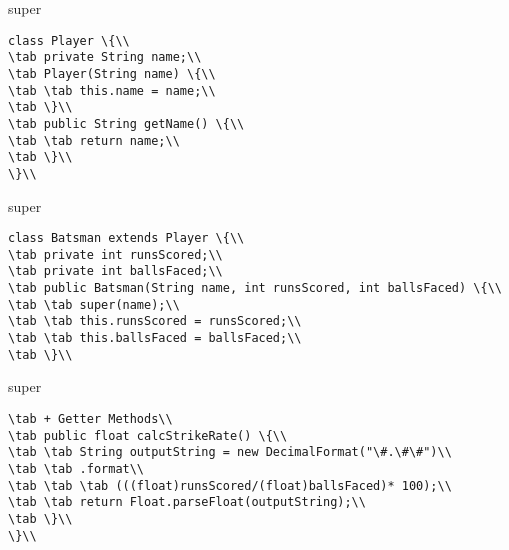 \documentclass[aspectratio=169,14pt,usenames,dvipsnames]{beamer}
\newcommand\tab[1][1cm]{\hspace*{#1}}
\begin{document}
\begin{frame}{super}
\begin{lstlisting}
class Player \{\\
\tab private String name;\\
\tab Player(String name) \{\\
\tab \tab this.name = name;\\
\tab \}\\
\tab public String getName() \{\\
\tab \tab return name;\\
\tab \}\\
\}\\
\end{lstlisting}
\end{frame}


\begin{frame}{super}
\begin{lstlisting}
class Batsman extends Player \{\\
\tab private int runsScored;\\
\tab private int ballsFaced;\\
\tab public Batsman(String name, int runsScored, int ballsFaced) \{\\
\tab \tab super(name);\\
\tab \tab this.runsScored = runsScored;\\
\tab \tab this.ballsFaced = ballsFaced;\\
\tab \}\\
\end{lstlisting}
\end{frame}


\begin{frame}{super}
\begin{lstlisting}
\tab + Getter Methods\\
\tab public float calcStrikeRate() \{\\
\tab \tab String outputString = new DecimalFormat("\#.\#\#")\\
\tab \tab .format\\
\tab \tab \tab (((float)runsScored/(float)ballsFaced)* 100);\\
\tab \tab return Float.parseFloat(outputString);\\
\tab \}\\
\}\\
\end{lstlisting}
\end{frame}
\end{document}
